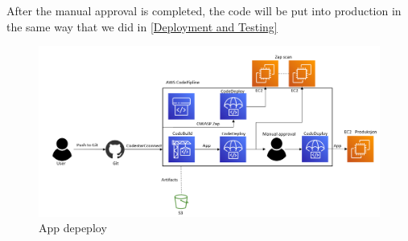 After the manual approval is completed, the code will be put into production in the same way that we did in \ref{Deployment and Testing} 
\vspace{2mm}
\begin{figure}[H]
    \centering
    \includegraphics[width=0.8\columnwidth]{Images/aws-piplin-7.png}
    \caption{App depeploy}
    \label{fig: App depeploy}
\end{figure}